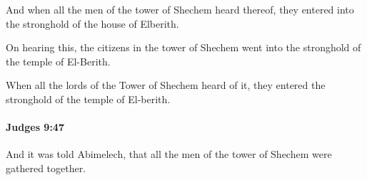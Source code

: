 			\begin{versebox}
					\item[BHS] 
					\item[ASV] And when all the men of the tower of Shechem heard thereof, they entered into the stronghold of the house of Elberith.
					\item[NIV] On hearing this, the citizens in the tower of Shechem went into the stronghold of the temple of El-Berith.
					\item[NRSV] When all the lords of the Tower of Shechem heard of it, they entered the stronghold of the temple of El-berith.
			\end{versebox}

		\paragraph{Judges 9:47} %
			\label{JUDGES-9-47}

			And it was told Abimelech, that all the men of the tower of Shechem were gathered together.

